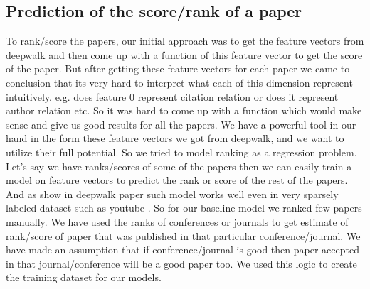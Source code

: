 \documentclass[a4paper, 11pt]{article}
\begin{document}
\subsection{Prediction of the score/rank of a paper} 
To rank/score the papers, our initial approach was to get the feature vectors from deepwalk and then come up with a function of this feature vector to get the score of the paper. But after getting these feature vectors for each paper we came to conclusion that its very hard to interpret what each of this dimension represent intuitively. e.g. does feature 0 represent citation relation or does it represent author relation etc.  So it was hard to come up with a function which would make sense and give us good results for all the papers. We have a powerful tool in our hand in the form these feature vectors we got from deepwalk, and we want to utilize their full potential. So we tried to model ranking as a regression problem. Let's say we have ranks/scores of some of the papers then we can easily train a model on feature vectors to predict the rank or score of the rest of the papers. And as show in deepwalk paper such model works well even in very sparsely labeled dataset such as youtube \cite{deepwalk}.  So for our baseline model we ranked few papers manually.  We have used the ranks of conferences or journals to get estimate of rank/score of paper that was published in that particular conference/journal. We have made an assumption that if conference/journal is good then paper accepted in that journal/conference will be a good paper too. We used this logic to create the training dataset for our models.
\end{document}
